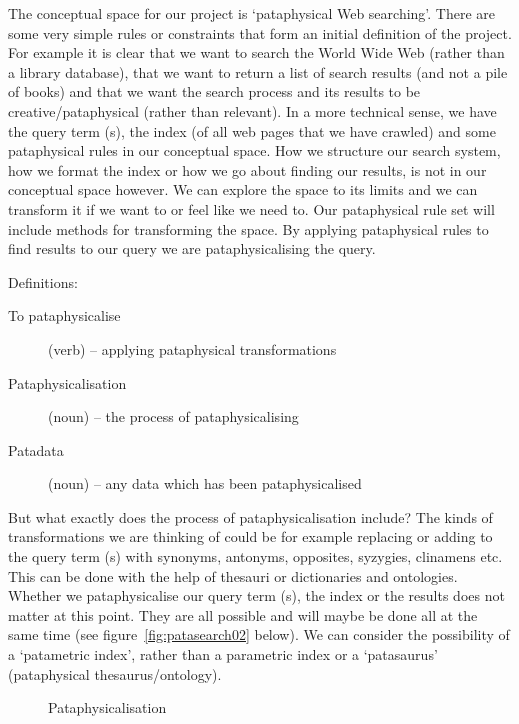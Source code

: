 The conceptual space for our project is `pataphysical Web searching'. There are some very simple rules or constraints that form an initial definition of the project. For example it is clear that we want to search the World Wide Web (rather than a library database), that we want to return a list of search results (and not a pile of books) and that we want the search process and its results to be creative/pataphysical (rather than relevant).  In a more technical sense, we have the query term (s), the index (of all web pages that we have crawled) and some pataphysical rules in our conceptual space. How we structure our search system, how we format the index or how we go about finding our results, is not in our conceptual space however. We can explore the space to its limits and we can transform it if we want to or feel like we need to. Our pataphysical rule set will include methods for transforming the space. By applying pataphysical rules to find results to our query we are pataphysicalising the query.

Definitions:
\begin{description}
  \item [To pataphysicalise] (verb) – applying pataphysical transformations
  \item [Pataphysicalisation] (noun) – the process of pataphysicalising
  \item [Patadata] (noun) – any data which has been pataphysicalised
\end{description}

But what exactly does the process of pataphysicalisation include? The kinds of transformations we are thinking of could be for example replacing or adding to the query term (s) with synonyms, antonyms, opposites, syzygies, clinamens etc. This can be done with the help of thesauri or dictionaries and ontologies. Whether we pataphysicalise our query term (s), the index or the results does not matter at this point. They are all possible and will maybe be done all at the same time (see figure~\ref{fig:patasearch02} below). We can consider the possibility of a `patametric index', rather than a parametric index or a `patasaurus' (pataphysical thesaurus/ontology).

\begin{figure}[htb] %
  \centering
  \def\svgwidth{\columnwidth}
  
\caption[Pataphysicalisation]{Pataphysicalisation}
\label{fig:patasearch02f}
\end{figure}

